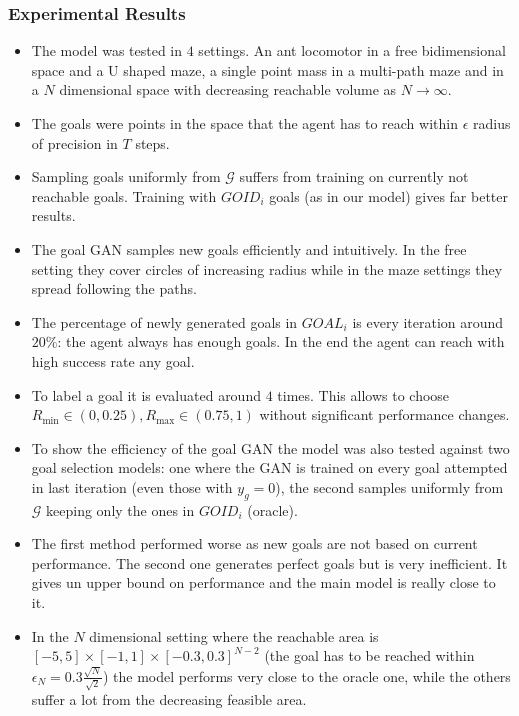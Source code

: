 \documentclass{beamer}
\theoremstyle{plain}
\theoremstyle{definition}
\theoremstyle{remark}
\begin{document}
\begin{frame}
	\frametitle{Experimental Results}
	\begin{itemize}
		\item The model was tested in $4$ settings. An ant locomotor in a free bidimensional space and a U shaped maze, a single point mass in a multi-path maze and in a $N$ dimensional space with decreasing reachable volume as $N\rightarrow\infty$.
		\item The goals were points in the space that the agent has to reach within $\epsilon$ radius of precision in $T$ steps.
		\item Sampling goals uniformly from $\mathcal{G}$ suffers from training on currently not reachable goals. Training with $GOID_i$ goals (as in our model) gives far better results.
		\item The goal GAN samples new goals efficiently and intuitively. In the free setting they cover circles of increasing radius while in the maze settings they spread following the paths.
		\item The percentage of newly generated goals in $GOAL_i$ is every iteration around $20\%$: the agent always has enough goals. In the end the agent can reach with high success rate any goal.
	\end{itemize}
\end{frame}

\begin{frame}
	\begin{itemize}
		\item To label a goal it is evaluated around $4$ times. This allows to choose $R_{\text{min}}\in(0,0.25), R_{\text{max}}\in(0.75,1)$ without significant performance changes.
		\item To show the efficiency of the goal GAN the model was also tested against two goal selection models: one where the GAN is trained on every goal attempted in last iteration (even those with $y_g=0$), the second samples uniformly from $\mathcal{G}$ keeping only the ones in $GOID_i$ (oracle).
		\item The first method performed worse as new goals are not based on current performance. The second one generates perfect goals but is very inefficient. It gives un upper bound on performance and the main model is really close to it.
		\item In the $N$ dimensional setting where the reachable area is $[-5,5]\times [-1,1]\times [-0.3,0.3]^{N-2}$ (the goal has to be reached within $\epsilon_N=0.3\frac{\sqrt{N}}{\sqrt{2}}$) the model performs very close to the oracle one, while the others suffer a lot from the decreasing feasible area.
	\end{itemize}
\end{frame}
\end{document}

